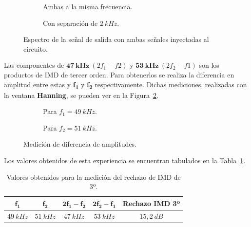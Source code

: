     \begin{figure}[H]
      \centering
      \begin{subfigure}[H]{0.48\textwidth}
        \caption{Ambas a la misma frecuencia.}
      \end{subfigure}
      \hfill 
      \begin{subfigure}[H]{0.48\textwidth}
        \caption{Con separación de $2~kHz$.}
      \end{subfigure}

      \caption{Espectro de la señal de salida con ambas señales inyectadas al circuito.}
      \label{fig:SalidaConAmbosGeneradores}
    \end{figure}

    Las componentes de $\mathbf{47~kHz}\  (2f_1 - f2)$ y $\mathbf{53~kHz}\  (2f_2 - f1)$ son los productos de IMD de tercer orden. Para obtenerlos
    se realiza la diferencia en amplitud entre estas y \textbf{f\textsubscript{1}} y \textbf{f\textsubscript{2}} respectivamente. Dichas mediciones,
    realizadas con la ventana \textbf{Hanning}, se pueden ver en la Figura~\ref{fig:MedicionIMD}.

    \begin{figure}[H]
      \centering
      \begin{subfigure}[H]{0.48\textwidth}
        \caption{Para $f_1=49~kHz$.}
      \end{subfigure}
      \hfill 
      \begin{subfigure}[H]{0.48\textwidth}
        \caption{Para $f_2=51~kHz$.}
      \end{subfigure}

      \caption{Medición de diferencia de amplitudes.}
      \label{fig:MedicionIMD}
    \end{figure}

    Los valores obtenidos de esta experiencia se encuentran tabulados en la Tabla~\ref{tab:DatosDeMedicionDeIMD}.

    \begin{table}[H]
      \centering
    \begin{tabular}{ccccc} \hline \hline
      $\mathbf{f_{1}}$    &   $\mathbf{f_{2}}$  &  $\mathbf{2f_{1}-f_{2}}$  & $\mathbf{2f_{2}-f_1}$  & \textbf{Rechazo IMD 3º}\\ \hline
      $49~kHz$   &   $51~kHz$   &    $47~kHz$   &   $53~kHz$  & $15,2~dB$ \\ \hline \hline
      \end{tabular}
      \caption{Valores obtenidos para la medición del rechazo de IMD de 3º.}
      \label{tab:DatosDeMedicionDeIMD}
    \end{table}


    \pagebreak


